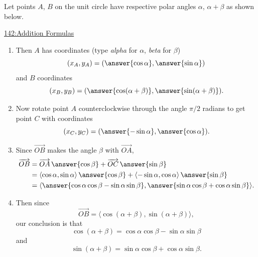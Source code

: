 \documentclass{ximera}
\begin{document}
\begin{example} \label{Qd2fr4fds3}


Let points $A$, $B$ on the unit circle have respective polar angles $\alpha$, $\alpha + \beta$ as shown below.
 
\begin{onlineOnly}
    \begin{center}
\end{center}
\end{onlineOnly}

\href{https://www.desmos.com/calculator/sqyf1ofoh8}{142:Addition Formulas}

\begin{enumerate}
\item Then $A$ has coordinates (type \emph{alpha} for $\alpha$, \emph{beta} for $\beta$)
\[
  (x_A, y_A) = (\answer{\cos \alpha}, \answer{\sin\alpha} )
\]
and $B$ coordinates
\[
 (x_B, y_B) = (\answer{\cos(\alpha+\beta)}, \answer{\sin(\alpha+\beta)} ).
\]

\item Now rotate point $A$ counterclockwise through the angle $\pi/2$ radians to get point $C$ with coordinates
\[
   (x_C, y_C) = (\answer{-\sin \alpha}, \answer{\cos\alpha} ).
\]

\item Since $\overrightarrow{OB}$ makes the angle $\beta$ with $\overrightarrow{OA}$, 
\begin{align*}
    \overrightarrow{OB} &= \overrightarrow{OA} \, \answer{\cos\beta} + \overrightarrow{OC} \, \answer{\sin\beta} \\
                                  &=\langle \cos\alpha, \sin\alpha\rangle \,  \answer{\cos\beta} + \langle -\sin\alpha, \cos\alpha \rangle \, \answer{\sin\beta}\\
                                  &= \langle  \answer{\cos\alpha \cos\beta - \sin\alpha \sin \beta} , \answer{\sin \alpha \cos\beta + \cos\alpha \sin\beta} \rangle .
\end{align*}

\item Then since 
\[
  \overrightarrow{OB} = \langle \cos(\alpha+\beta), \sin(\alpha+\beta)  \rangle,
\]
our conclusion is that
\[
  \cos(\alpha + \beta) = \cos\alpha \cos\beta - \sin\alpha \sin \beta
\]
and
\[
  \sin(\alpha + \beta) = \sin \alpha \cos\beta + \cos\alpha \sin\beta .
\]
\end{enumerate}
\end{example}
\end{document}
